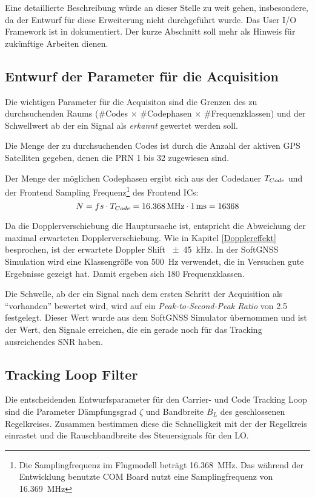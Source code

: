 Eine detaillierte Beschreibung würde an dieser Stelle zu weit gehen, insbesondere, da der Entwurf für diese Erweiterung nicht durchgeführt wurde. Das User I/O Framework ist in \cite{uioHowto} dokumentiert. Der kurze Abschnitt soll mehr als Hinweis für zukünftige Arbeiten dienen.


\subsection{Entwurf der Parameter für die Acquisition}
Die wichtigen Parameter für die Acquisiton sind die Grenzen des zu durchsuchenden Raums (\#Codes $\times$ \#Codephasen $\times$ \#Frequenzklassen) und der Schwellwert ab der ein Signal als \emph{erkannt} gewertet werden soll.

Die Menge der zu durchsuchenden Codes ist durch die Anzahl der aktiven GPS Satelliten gegeben, denen die PRN 1 bis 32 zugewiesen sind. 

Der Menge der möglichen Codephasen ergibt sich aus der Codedauer ${T}_{Code}$ und der Frontend Sampling Frequenz\footnote{Die Samplingfrequenz im Flugmodell beträgt \SI{16.368}{\mega\hertz}. Das während der Entwicklung benutzte COM Board nutzt eine Samplingfrequenz von  \SI{16.369}{\mega\hertz}} des Frontend ICs:  
\begin{equation}
    N=fs\cdot {T}_{Code}=\SI{16.368}{\mega\hertz}\cdot \SI{1}{\milli\second} = 16368
\end{equation} 

Da die Dopplerverschiebung die Hauptursache ist, entspricht die Abweichung der maximal erwarteten Dopplerverschiebung. Wie in Kapitel \ref{Dopplereffekt} besprochen, ist der erwartete Doppler Shift \SI{\pm45}{\kilo\hertz}. In der SoftGNSS Simulation wird eine Klassengröße von \SI{500}{\Hz} verwendet, die in Versuchen gute Ergebnisse gezeigt hat. Damit ergeben sich 180 Frequenzklassen.

Die Schwelle, ab der ein Signal nach dem ersten Schritt der Acquisition als \enquote{vorhanden} bewertet wird, wird auf ein \emph{Peak-to-Second-Peak Ratio} von \num{2.5} festgelegt. Dieser Wert wurde aus dem SoftGNSS Simulator übernommen und ist der Wert, den Signale erreichen, die ein gerade noch für das Tracking ausreichendes SNR haben.

\subsection{Tracking Loop Filter}
Die entscheidenden Entwurfsparameter für den Carrier- und Code Tracking Loop sind die Parameter Dämpfungsgrad $\zeta$ und Bandbreite $B_L$ des geschlossenen Regelkreises. Zusammen bestimmen diese die Schnelligkeit mit der der Regelkreis einrastet und die Rauschbandbreite des Steuersignals für den LO. 

